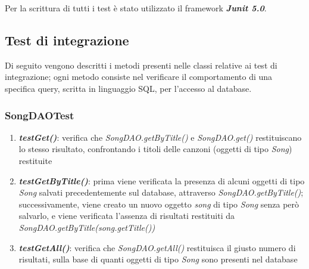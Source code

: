 \documentclass{article}
\begin{document}
  Per la scrittura di tutti i test è stato utilizzato il framework \textbf{\textit{Junit 5.0}}.

  \subsection{Test di integrazione}
  Di seguito vengono descritti i metodi presenti nelle classi relative ai test di integrazione; ogni metodo consiste nel verificare il comportamento di una specifica query, scritta in linguaggio SQL, per l'accesso al database.


  \subsubsection{SongDAOTest}
  \begin{enumerate}

    \item \textbf{\textit{testGet()}}: verifica che \textit{SongDAO.getByTitle()} e \textit{SongDAO.get()} restituiscano lo stesso risultato, confrontando i titoli delle canzoni (oggetti di tipo \textit{Song}) restituite

    \item \textbf{\textit{testGetByTitle()}}: prima viene verificata la presenza di alcuni oggetti di tipo \textit{Song} salvati precedentemente sul database, attraverso \textit{SongDAO.getByTitle()}; successivamente, viene creato un nuovo oggetto \textit{song} di tipo \textit{Song} senza però salvarlo, e viene verificata l'assenza di risultati restituiti da \textit{SongDAO.getByTitle(song.getTitle())}

    \item \textbf{\textit{testGetAll()}}: verifica che \textit{SongDAO.getAll()} restituisca il giusto numero di risultati, sulla base di quanti oggetti di tipo \textit{Song} sono presenti nel database

  \end{enumerate}
\end{document}
